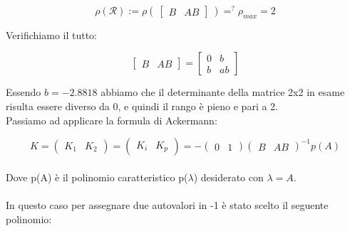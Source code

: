 \documentclass[a4paper,13pt]{article}
\begin{document}
\begin{equation*}
	\rho(\mathcal{R}):=
\rho(\:\begin{bmatrix}

	B&AB

\end{bmatrix}\:)=^{?}\rho_{max}=2
\end{equation*}

	Verifichiamo il tutto:
	
\begin{equation*}
\begin{bmatrix}

	B&AB

\end{bmatrix} =              %
\begin{bmatrix}

	0&b\\b&ab

\end{bmatrix}
\end{equation*}

	Essendo $b=-2.8818$ abbiamo che il determinante della matrice  2x2 in esame risulta essere diverso da 0,
	e quindi il rango è pieno e pari a 2.\\
	Passiamo ad applicare la formula di Ackermann:
	
\begin{equation*}                    %
	K=
\begin{pmatrix}

	K_{1}&K_{2}

\end{pmatrix} =						%
\begin{pmatrix}

	K_{i}&K_{p}						

\end{pmatrix} = -					%
\begin{pmatrix}

	0&1						

\end{pmatrix}
\begin{pmatrix}

	B&AB					

\end{pmatrix}^{-1}p(A)
\end{equation*} \\

		Dove p(A) è il polinomio caratteristico p($\lambda$) desiderato con $\lambda=A$.\\\\
	In questo caso per assegnare due autovalori in -1 è stato scelto il seguente polinomio:\\
\end{document}
